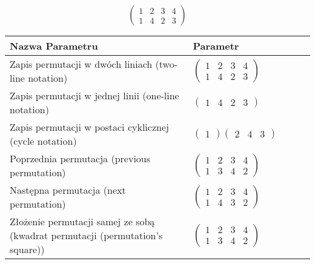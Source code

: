 \documentclass[12pt]{article}
\begin{document}
\subsection{}
\begin{center}
\[
\begin{pmatrix}
	1 & 2 & 3 & 4 \\ 
	1 & 4 & 2 & 3 
\end{pmatrix}
\]

\begin{tabular}{|m{0.6\linewidth}|m{0.4\linewidth}|}
	\hline
	Nazwa Parametru & Parametr \\
	\hline
	Zapis permutacji w dwóch liniach (two-line notation) & $\begin{pmatrix} 1 & 2 & 3 & 4 \\ 
1 & 4 & 2 & 3 \end{pmatrix}$ \\ 
	\hline
	Zapis permutacji w jednej linii (one-line notation) & $\begin{pmatrix} 1 & 4 & 2 & 3 \end{pmatrix}$ \\ 
	\hline
	Zapis permutacji w postaci cyklicznej (cycle notation) & $\begin{pmatrix} 1 \end{pmatrix} \begin{pmatrix} 2 & 4 & 3 \end{pmatrix} $ \\ 
	\hline
	Poprzednia permutacja (previous permutation) & $\begin{pmatrix} 1 & 2 & 3 & 4 \\ 
1 & 3 & 4 & 2 \end{pmatrix}$ \\ 
	\hline
	Następna permutacja (next permutation) & $\begin{pmatrix} 1 & 2 & 3 & 4 \\ 
1 & 4 & 3 & 2 \end{pmatrix}$ \\ 
	\hline
	Złożenie permutacji samej ze sobą (kwadrat permutacji (permutation's square)) & $\begin{pmatrix} 1 & 2 & 3 & 4 \\ 
1 & 3 & 4 & 2 \end{pmatrix}$ \\ 
	\hline
\end{tabular}
\end{center}
\end{document}
